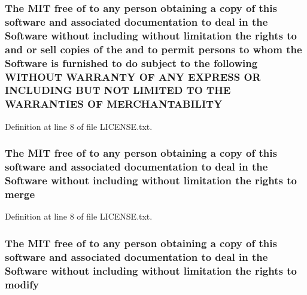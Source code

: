 \subsubsection[{\texorpdfstring{M\+E\+R\+C\+H\+A\+N\+T\+A\+B\+I\+L\+I\+TY}{MERCHANTABILITY}}]{\setlength{\rightskip}{0pt plus 5cm}The M\+IT free of to any person obtaining a {\bf copy} of this software and associated documentation to deal in the {\bf Software} without including without limitation the rights to and or sell copies of the and to permit persons to whom the {\bf Software} is furnished to do subject to the following W\+I\+T\+H\+O\+UT W\+A\+R\+R\+A\+N\+TY OF A\+NY E\+X\+P\+R\+E\+SS OR I\+N\+C\+L\+U\+D\+I\+NG B\+UT N\+OT L\+I\+M\+I\+T\+ED TO T\+HE W\+A\+R\+R\+A\+N\+T\+I\+ES OF M\+E\+R\+C\+H\+A\+N\+T\+A\+B\+I\+L\+I\+TY}\hypertarget{LICENSE_8txt_a82e4fcb28d3925b81ac5f50e2b22c270}{}\label{LICENSE_8txt_a82e4fcb28d3925b81ac5f50e2b22c270}


Definition at line 8 of file L\+I\+C\+E\+N\+S\+E.\+txt.

\subsubsection[{\texorpdfstring{merge}{merge}}]{\setlength{\rightskip}{0pt plus 5cm}The M\+IT free of to any person obtaining a {\bf copy} of this software and associated documentation to deal in the {\bf Software} without including without limitation the rights to merge}\hypertarget{LICENSE_8txt_a7653d3ec339e97ccc64ec4f74e440441}{}\label{LICENSE_8txt_a7653d3ec339e97ccc64ec4f74e440441}


Definition at line 8 of file L\+I\+C\+E\+N\+S\+E.\+txt.

\subsubsection[{\texorpdfstring{modify}{modify}}]{\setlength{\rightskip}{0pt plus 5cm}The M\+IT free of to any person obtaining a {\bf copy} of this software and associated documentation to deal in the {\bf Software} without including without limitation the rights to modify}\hypertarget{LICENSE_8txt_a4f5fee3fe655fc467fc80425521837ae}{}\label{LICENSE_8txt_a4f5fee3fe655fc467fc80425521837ae}



